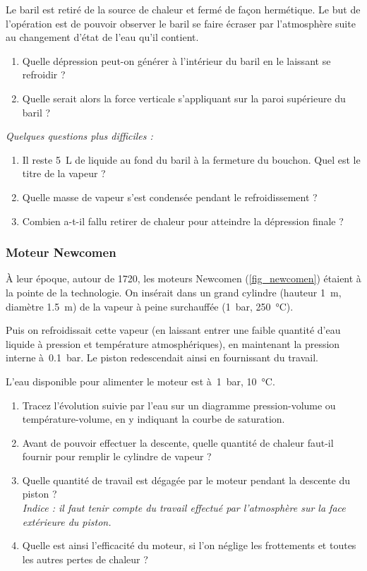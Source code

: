 	Le baril est retiré de la source de chaleur et fermé de façon hermétique. Le but de l’opération est de pouvoir observer le baril se faire écraser par l’atmosphère suite au changement d’état de l’eau qu’il contient.

	\begin{enumerate}
		\item Quelle dépression peut-on générer à l’intérieur du baril en le laissant se refroidir ?
		\item Quelle serait alors la force verticale s’appliquant sur la paroi supérieure du baril ?
	\end{enumerate}
	
	\textit{Quelques questions plus difficiles :}
		
	\begin{enumerate}
		\item Il reste \SI{5}{\liter} de liquide au fond du baril à la fermeture du bouchon. Quel est le titre de la vapeur ?
		\item Quelle masse de vapeur s’est condensée pendant le refroidissement ?
		\item Combien a-t-il fallu retirer de chaleur pour atteindre la dépression finale ?
	\end{enumerate}

\subsubsection{Moteur Newcomen}
\label{exo_moteur_newcomen}

	À leur époque, autour de 1720, les moteurs Newcomen (\cref{fig_newcomen}) étaient à la pointe de la technologie. On insérait dans un grand cylindre (hauteur \SI{1}{\metre}, diamètre \SI{1.5}{\metre}) de la vapeur à peine surchauffée (\SI{1}{\bar}, \SI{250}{\degreeCelsius}).
	
	Puis on refroidissait cette vapeur (en laissant entrer une faible quantité d’eau liquide à pression et température atmosphériques), en maintenant la pression interne à~\SI{0,1}{\bar}. Le piston redescendait ainsi en fournissant du travail.
	
	L’eau disponible pour alimenter le moteur est à~\SI{1}{\bar}, \SI{10}{\degreeCelsius}.
	
	\begin{enumerate}
		\item Tracez l’évolution suivie par l’eau sur un diagramme pression-volume ou température-volume, en y indiquant la courbe de saturation.
		\item Avant de pouvoir effectuer la descente, quelle quantité de chaleur faut-il fournir pour remplir le cylindre de vapeur ?
		\item Quelle quantité de travail est dégagée par le moteur pendant la descente du piston ?\\
				\textit{Indice : il faut tenir compte du travail effectué par l’atmosphère sur la face extérieure du piston.}
		\item Quelle est ainsi l’efficacité du moteur, si l’on néglige les frottements et toutes les autres pertes de chaleur ?
	\end{enumerate}

